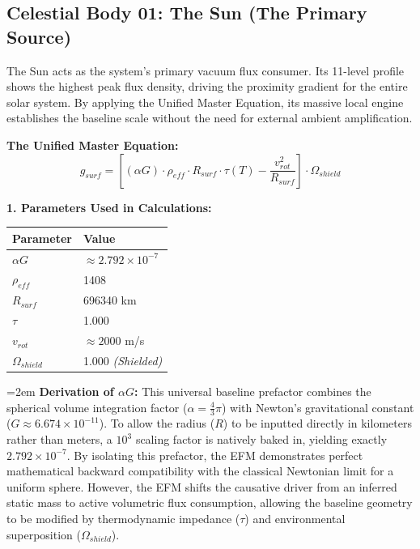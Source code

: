 \documentclass[11pt, a4paper]{article}
\begin{document}
\clearpage
\subsection{Celestial Body 01: The Sun (The Primary Source)}
  The Sun acts as the system's primary vacuum flux consumer. Its 11-level profile shows the highest peak flux density, driving the proximity gradient for the entire solar system. By applying the Unified Master Equation, its massive local engine establishes the baseline scale without the need for external ambient amplification.

  \vspace{0.5em}
  \noindent \textbf{The Unified Master Equation:}
  $$ g_{surf} = \left[ (\alpha G) \cdot \rho_{eff} \cdot R_{surf} \cdot \tau(T) - \frac{v_{rot}^2}{R_{surf}} \right] \cdot \Omega_{shield} $$

  \vspace{0.5em}
  \noindent \textbf{1. Parameters Used in Calculations:} \\[0.5em]
  \begingroup
  \renewcommand{\arraystretch}{1.3}
  \hspace*{2em}
  \begin{tabular}{|l|l|}
    \hline
    \textbf{Parameter} & \textbf{Value} \\ \hline
    $\alpha G$ & $\approx 2.792 \times 10^{-7}$ \\ \hline
    $\rho_{eff}$ & 1408 \\ \hline
    $R_{surf}$ & 696340 km \\ \hline
    $\tau$ & 1.000 \\ \hline
    $v_{rot}$ & $\approx 2000$ m/s \\ \hline
    $\Omega_{shield}$ & 1.000 \textit{(Shielded)} \\ \hline
  \end{tabular}
  \endgroup

  \vspace{1.0em}
  \begingroup
  \leftskip=2em
  \noindent \textbf{Derivation of $\alpha G$:} This universal baseline prefactor combines the spherical volume integration factor ($\alpha = \frac{4}{3}\pi$) with Newton's gravitational constant ($G \approx 6.674 \times 10^{-11}$). To allow the radius ($R$) to be inputted directly in kilometers rather than meters, a $10^3$ scaling factor is natively baked in, yielding exactly $2.792 \times 10^{-7}$. By isolating this prefactor, the EFM demonstrates perfect mathematical backward compatibility with the classical Newtonian limit for a uniform sphere. However, the EFM shifts the causative driver from an inferred static mass to active volumetric flux consumption, allowing the baseline geometry to be modified by thermodynamic impedance ($\tau$) and environmental superposition ($\Omega_{shield}$).\par
  \endgroup
\end{document}
